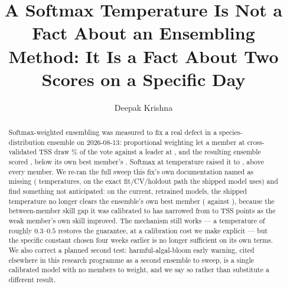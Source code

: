 \documentclass[runningheads]{llncs}
\begin{document}
\title{A Softmax Temperature Is Not a Fact About an Ensembling Method: It Is
a Fact About Two Scores on a Specific Day}


\author{Deepak Krishna}

\maketitle

\begin{abstract}
Softmax-weighted ensembling was measured to fix a real defect in a
species-distribution ensemble on 2026-08-13: proportional weighting let a
member at cross-validated TSS \HistMaxentCV{} draw \HistMaxentVote{}\% of
the vote against a leader at \HistLgbmCV{}, and the resulting ensemble
scored \HistPropTSS{}, below its own best member's \HistBestMemberTSS{}.
Softmax at temperature \ShippedTemperature{} raised it to
\HistSoftmaxTSS{}, above every member. We re-ran the full sweep this fix's
own documentation named as missing (\NSweepPoints{} temperatures, on the
exact fit/CV/holdout path the shipped model uses) and find something not
anticipated: on the current, retrained models, the shipped temperature no
longer clears the ensemble's own best member (\CurShippedTSS{} against
\CurLgbmHoldoutTSS{}), because the between-member skill gap it was
calibrated to has narrowed from \HistGap{} to \CurGap{} TSS points as the
weak member's own skill improved. The mechanism still works --- a
temperature of roughly \(0.3\)--\(0.5\) restores the guarantee, at a
calibration cost we make explicit --- but the specific constant chosen four
weeks earlier is no longer sufficient on its own terms. We also correct a
planned second test: harmful-algal-bloom early warning, cited elsewhere in
this research programme as a second ensemble to sweep, is a single
calibrated model with no members to weight, and we say so rather than
substitute a different result.
\end{abstract}


\end{document}
